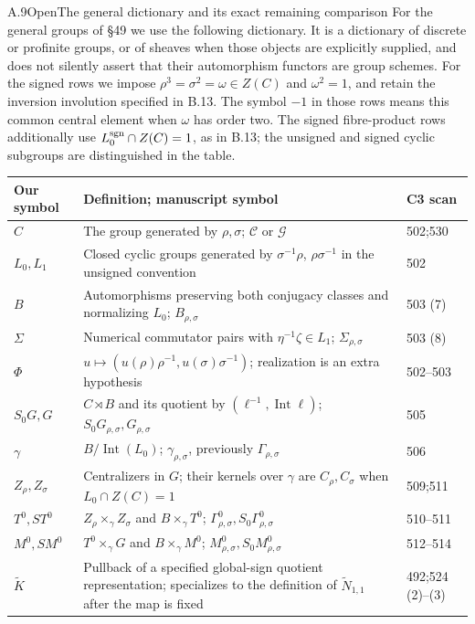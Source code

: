 \begin{statement}{A.9}{Open}{The general dictionary and its exact remaining comparison}
For the general groups of \S49 we use the following dictionary.
It is a dictionary of discrete or profinite groups, or of sheaves
when those objects are explicitly supplied, and does not silently
assert that their automorphism functors are group schemes.
For the signed rows we impose
$\rho^3=\sigma^2=\omega\in Z(C)$ and $\omega^2=1$,
and retain the inversion involution specified in B.13.
The symbol $-1$ in those rows means this common central element
when $\omega$ has order two.
The signed fibre-product rows additionally use
$L_0^{\rm sgn}\cap Z(C)=1$, as in B.13; the unsigned and signed
cyclic subgroups are distinguished in the table.
\end{statement}
\begin{longtable}{p{.17\linewidth}p{.57\linewidth}p{.16\linewidth}}
\toprule Our symbol&Definition; manuscript symbol&C3 scan\\\midrule\endhead
$C$&The group generated by $\rho,\sigma$; $\mathcal C$ or $\mathcal G$&502;530\\
$L_0,L_1$&Closed cyclic groups generated by $\sigma^{-1}\rho$, $\rho\sigma^{-1}$ in the unsigned convention&502\\
$B$&Automorphisms preserving both conjugacy classes and normalizing $L_0$; $B_{\rho,\sigma}$&503 (7)\\
$\Sigma$&Numerical commutator pairs with $\eta^{-1}\zeta\in L_1$; $\Sigma_{\rho,\sigma}$&503 (8)\\
$\Phi$&$u\mapsto(u(\rho)\rho^{-1},u(\sigma)\sigma^{-1})$; realization is an extra hypothesis&502--503\\
$S_0G,G$&$C\rtimes B$ and its quotient by $(\ell^{-1},\operatorname{Int}\ell)$; $S_0G_{\rho,\sigma},G_{\rho,\sigma}$&505\\
$\gamma$&$B/\operatorname{Int}(L_0)$; $\gamma_{\rho,\sigma}$, previously $\Gamma_{\rho,\sigma}$&506\\
$Z_\rho,Z_\sigma$&Centralizers in $G$; their kernels over $\gamma$ are $C_\rho,C_\sigma$ when $L_0\cap Z(C)=1$&509;511\\
$T^0,ST^0$&$Z_\rho\times_\gamma Z_\sigma$ and $B\times_\gamma T^0$; $\Gamma^0_{\rho,\sigma},S_0\Gamma^0_{\rho,\sigma}$&510--511\\
$M^0,SM^0$&$T^0\times_\gamma G$ and $B\times_\gamma M^0$; $M^0_{\rho,\sigma},S_0M^0_{\rho,\sigma}$&512--514\\
$\widetilde K$&Pullback of a specified global-sign quotient representation; specializes to the definition of $\widetilde N_{1,1}$ after the map is fixed&492;524 (2)--(3)\\

\end{longtable}
